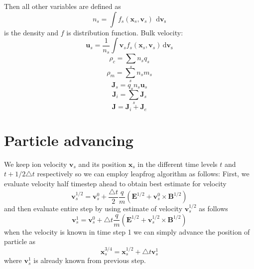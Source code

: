 \documentclass[oneside,branding,toc,article]{sat}
\begin{document}
Then all other variables are defined as
\begin{equation}
  n_s = \int f_s(\mathbf{x}_s,\mathbf{v}_s) ~ \, \mathrm{d\mathbf{v}_s}
\end{equation}
is the density and $f$ is distribution function. Bulk velocity:
\begin{equation}
  \mathbf{u}_s =
  \frac{1}{n_s} \int \mathbf{v}_s f_s(\mathbf{x}_s,\mathbf{v}_s) \, \mathrm{d\mathbf{v}_s}
\end{equation}
\begin{equation}
  \rho_c = \sum_{s}n_sq_s
\end{equation}
\begin{equation}
  \rho_m = \sum_{s}n_sm_s
\end{equation}
\begin{equation}
  \mathbf{J}_s = q_sn_s\mathbf{u}_s
\end{equation}
\begin{equation}
  \mathbf{J}_i = \sum_{s}\mathbf{J}_s
\end{equation}
\begin{equation}
  \mathbf{J} = \mathbf{J}_i + \mathbf{J}_e
\end{equation}

\section{Particle advancing}
We keep ion velocity $\mathbf{v}_s$ and its position $\mathbf{x}_s$ in the
different time levels $t$ and $t+1/2 \triangle t$ respectively so we can employ
leapfrog algorithm as follows: First, we evaluate velocity half timestep ahead
to obtain best estimate for velocity
\begin{equation}
  \label{eq:vh}
  \mathbf{v}_s^{1/2} = \mathbf{v}_s^{0} + \frac{\triangle t}{2} \frac{q}{m}
  \left( \mathbf{E}^{1/2} + \mathbf{v}_s^{0} \times \mathbf{B}^{1/2} \right)
\end{equation}
and then evaluate entire step by using estimate of velocity
$\mathbf{v}_s^{1/2}$ as follows
\begin{equation}
  \label{eq:vf}
  \mathbf{v}_s^{1} = \mathbf{v}_s^{0} + \triangle t \frac{q}{m}
  \left( \mathbf{E}^{1/2} + \mathbf{v}_s^{1/2} \times \mathbf{B}^{1/2} \right)
\end{equation}
when the velocity is known in time step 1 we can simply advance the position of
particle as
\begin{equation}
  \label{eq:x}
  \mathbf{x}_s^{3/4} = \mathbf{x}_s^{1/2} + \triangle t \mathbf{v}_s^{1}
\end{equation}
where $\mathbf{v}_s^{1}$ is already known from previous step.
\end{document}
